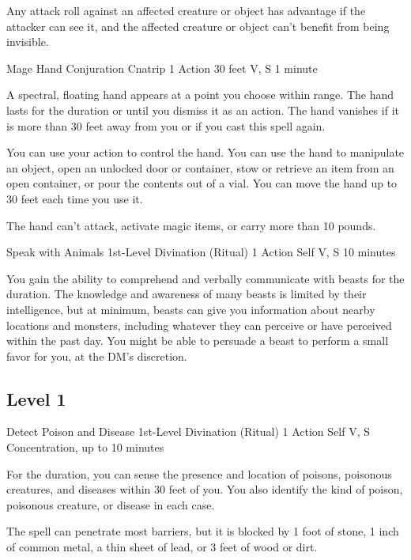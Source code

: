 \documentclass[letterpaper,openany,oneside,twocolumn]{book}
\begin{document}
Any attack roll against an affected creature or object has advantage if the attacker can see it, and the affected creature or object can't benefit from being invisible.

\DndSpellHeader
  {Mage Hand}
  {Conjuration Cnatrip}
  {1 Action}
  {30 feet}
  {V, S}
  {1 minute}

A spectral, floating hand appears at a point you choose within range. The hand lasts for the duration or until you dismiss it as an action. The hand vanishes if it is more than 30 feet away from you or if you cast this spell again.

You can use your action to control the hand. You can use the hand to manipulate an object, open an unlocked door or container, stow or retrieve an item from an open container, or pour the contents out of a vial. You can move the hand up to 30 feet each time you use it.

The hand can't attack, activate magic items, or carry more than 10 pounds.

\DndSpellHeader
  {Speak with Animals}
  {1st-Level Divination (Ritual)}
  {1 Action}
  {Self}
  {V, S}
  {10 minutes}

You gain the ability to comprehend and verbally communicate with beasts for the duration. The knowledge and awareness of many beasts is limited by their intelligence, but at minimum, beasts can give you information about nearby locations and monsters, including whatever they can perceive or have perceived within the past day. You might be able to persuade a beast to perform a small favor for you, at the DM's discretion.

\subsection*{Level 1}

\DndSpellHeader
  {Detect Poison and Disease}
  {1st-Level Divination (Ritual)}
  {1 Action}
  {Self}
  {V, S}
  {Concentration, up to 10 minutes}

For the duration, you can sense the presence and location of poisons, poisonous creatures, and diseases within 30 feet of you. You also identify the kind of poison, poisonous creature, or disease in each case.

The spell can penetrate most barriers, but it is blocked by 1 foot of stone, 1 inch of common metal, a thin sheet of lead, or 3 feet of wood or dirt.

\hfill\\
\end{document}
